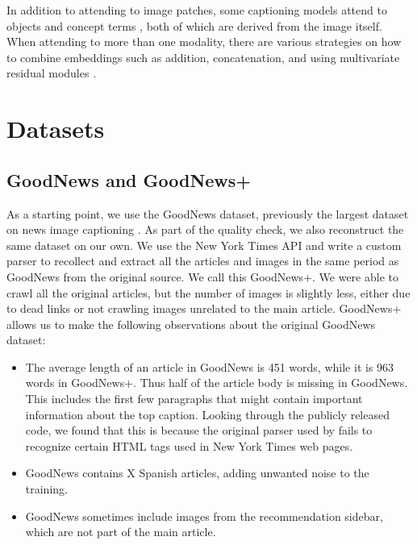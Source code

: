\documentclass[10pt,twocolumn,letterpaper]{article}
\begin{document}
In addition to attending to image patches, some captioning models attend to
objects \cite{Wang2019Hierarchical} and concept terms
\cite{Wang2019Hierarchical,Li2019Boosted}, both of which are derived from the
image itself. When attending to more than one modality, there are various
strategies on how to combine embeddings such as addition, concatenation, and
using multivariate residual modules \cite{Wang2019Hierarchical}.



\section{Datasets}

\subsection{GoodNews and GoodNews+}

As a starting point, we use the GoodNews dataset, previously the largest
dataset on news image captioning \cite{Biten2019GoodNews}. As part of the
quality check, we also reconstruct the same dataset on our own. We use the New
York Times API and write a custom parser to recollect and extract all the
articles and images in the same period as GoodNews from the original source. We
call this GoodNews+. We were able to crawl all the original articles, but the
number of images is slightly less, either due to dead links or not crawling
images unrelated to the main article. GoodNews+ allows us to make the following
observations about the original GoodNews dataset:

\begin{itemize}
   \item The average length of an article in GoodNews is 451 words, while it is
         963 words in GoodNews+. Thus half of the article body is missing in
         GoodNews. This includes the first few paragraphs that might contain
         important information about the top caption. Looking through the
         publicly released code, we found that this is because the original
         parser used by \cite{Biten2019GoodNews} fails to recognize certain
         HTML tags used in New York Times web pages.
   \item GoodNews contains X Spanish articles, adding unwanted noise to the
         training.
   \item GoodNews sometimes include images from the recommendation sidebar,
         which are not part of the main article.
\end{itemize}
\end{document}
